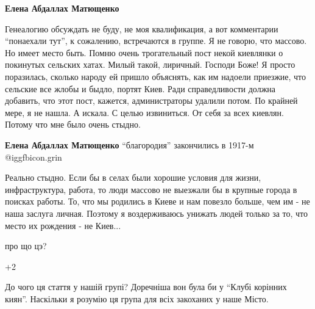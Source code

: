 \begin{itemize}
\begin{itemize}
\textbf{Елена Абдаллах Матющенко} 

Генеалогию обсуждать не буду, не моя квалификация, а вот комментарии \enquote{понаехали
тут}, к сожалению, встречаются в группе. Я не говорю, что массово. Но имеет
место быть. Помню очень трогательный пост некой киевлянки о покинутых сельских
хатах. Милый такой, лиричный. Господи Боже! Я просто поразилась, сколько народу
ей пришло объяснять, как им надоели приезжие, что сельские все жлобы и быдло,
портят Киев. Ради справедливости должна добавить, что этот пост, кажется,
администраторы удалили потом. По крайней мере, я не нашла. А искала. С целью
извиниться. От себя за всех киевлян. Потому что мне было очень стыдно.

\textbf{Елена Абдаллах Матющенко} \enquote{благородия} закончились в 1917-м  @igg{fbicon.grin} 


Реально стыдно. Если бы в селах были хорошие условия для
жизни, инфраструктура, работа, то люди массово не выезжали бы в крупные города в
поисках работы. То, что мы родились в Киеве и нам повезло больше, чем им - не наша
заслуга личная. Поэтому я воздерживаюсь унижать людей только за то, что место их
рождения - не Киев...

\end{itemize} %

про що цэ?


+2

До чого ця стаття у нашій групі? Доречніша вон була би у \enquote{Клубі корінних киян}.
Наскільки я розумію ця група для всіх закоханих у наше Місто.

\end{itemize} %
